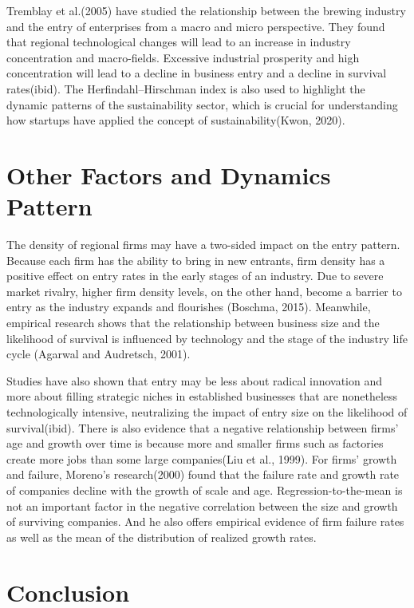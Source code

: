 \documentclass[
  12pt,
  oneside]{book}
\begin{document}
Tremblay et al.(2005) have studied the relationship between the brewing industry and the entry of enterprises from a macro and micro perspective. They found that regional technological changes will lead to an increase in industry concentration and macro-fields. Excessive industrial prosperity and high concentration will lead to a decline in business entry and a decline in survival rates(ibid). The Herfindahl--Hirschman index is also used to highlight the dynamic patterns of the sustainability sector, which is crucial for understanding how startups have applied the concept of sustainability(Kwon, 2020).

\hypertarget{other-factors-and-dynamics-pattern}{%
\section{Other Factors and Dynamics Pattern}\label{other-factors-and-dynamics-pattern}}

The density of regional firms may have a two-sided impact on the entry pattern. Because each firm has the ability to bring in new entrants, firm density has a positive effect on entry rates in the early stages of an industry. Due to severe market rivalry, higher firm density levels, on the other hand, become a barrier to entry as the industry expands and flourishes (Boschma, 2015). Meanwhile, empirical research shows that the relationship between business size and the likelihood of survival is influenced by technology and the stage of the industry life cycle (Agarwal and Audretsch, 2001).

Studies have also shown that entry may be less about radical innovation and more about filling strategic niches in established businesses that are nonetheless technologically intensive, neutralizing the impact of entry size on the likelihood of survival(ibid). There is also evidence that a negative relationship between firms' age and growth over time is because more and smaller firms such as factories create more jobs than some large companies(Liu et al., 1999). For firms' growth and failure, Moreno's research(2000) found that the failure rate and growth rate of companies decline with the growth of scale and age. Regression-to-the-mean is not an important factor in the negative correlation between the size and growth of surviving companies. And he also offers empirical evidence of firm failure rates as well as the mean of the distribution of realized growth rates.

\hypertarget{conclusion}{%
\section{Conclusion}\label{conclusion}}
\end{document}
